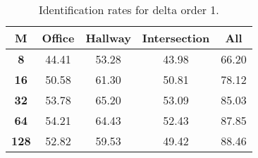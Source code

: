 \begin{table}[h]
    \small
    \centering
    \begin{tabular}{|c|c|c|c|l|}    
    \hline
    {\bf M} & {\bf Office} & {\bf Hallway} & {\bf Intersection} &     \multicolumn{1}{c|}{{\bf All}} \\ \hline
    {\bf 8} & 44.41 & 53.28 & 43.98 & 66.20 \\ \hline
    {\bf 16} & 50.58 & 61.30 & 50.81 & 78.12 \\ \hline
    {\bf 32} & 53.78 & 65.20 & 53.09 & 85.03 \\ \hline
    {\bf 64} & 54.21 & 64.43 & 52.43 & 87.85 \\ \hline
    {\bf 128} & 52.82 & 59.53 & 49.42 & 88.46 \\ \hline
    \end{tabular}
    \caption{Identification rates for delta order 1.}    
    \label{tab:identify_speakers_mit_19_1}
\end{table}

